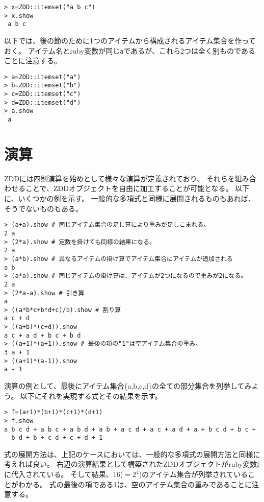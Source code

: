 \begin{Verbatim}[baselinestretch=0.7,frame=single]
> x=ZDD::itemset("a b c")
> x.show
 a b c
\end{Verbatim}

以下では、後の節のために1つのアイテムから構成されるアイテム集合を作っておく。
アイテム名とruby変数が同じ\verb|a|であるが、これら2つは全く別ものであることに注意する。

\begin{Verbatim}[baselinestretch=0.7,frame=single]
> a=ZDD::itemset("a")
> b=ZDD::itemset("b")
> c=ZDD::itemset("c")
> d=ZDD::itemset("d")
> a.show
 a
\end{Verbatim}

\section{演算\label{sect:tut_ope}}
ZDDには四則演算を始めとして様々な演算が定義されており、
それらを組み合わせることで、ZDDオブジェクトを自由に加工することが可能となる。
以下に、いくつかの例を示す。
一般的な多項式と同様に展開されるものもあれば、そうでないものもある。

\begin{Verbatim}[baselinestretch=0.7,frame=single]
> (a+a).show # 同じアイテム集合の足し算により重みが足しこまれる。
2 a
> (2*a).show # 定数を掛けても同様の結果になる。
2 a
> (a*b).show # 異なるアイテムの掛け算でアイテム集合にアイテムが追加される
a b
> (a*a).show # 同じアイテムの掛け算は、アイテムが2つになるので重みが2になる。
2 a
> (2*a-a).show # 引き算
a
> ((a*b*c+b*d+c)/b).show # 割り算
a c + d
> ((a+b)*(c+d)).show
a c + a d + b c + b d 
> ((a+1)*(a+1)).show # 最後の項の"1"は空アイテム集合の重み。
3 a + 1
> ((a+1)*(a-1)).show
a - 1
\end{Verbatim}

演算の例として、最後にアイテム集合\{a,b,c,d\}の全ての部分集合を列挙してみよう。
以下にそれを実現する式とその結果を示す。

\begin{Verbatim}[baselinestretch=0.7,frame=single]
> f=(a+1)*(b+1)*(c+1)*(d+1)
> f.show
a b c d + a b c + a b d + a b + a c d + a c + a d + a + b c d + b c +
  b d + b + c d + c + d + 1
\end{Verbatim}

式の展開方法は、上記のケースにおいては、一般的な多項式の展開方法と同様に考えれば良い。
右辺の演算結果として構築されたZDDオブジェクトがruby変数fに代入されている。
そして結果、16($=2^4$)のアイテム集合が列挙されていることがわかる。
式の最後の項である1は、空のアイテム集合の重みであることに注意する。

